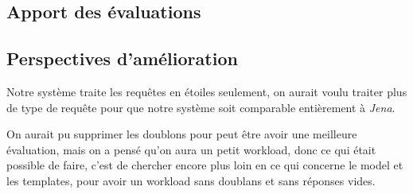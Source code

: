 \documentclass[12pt,titlepage]{article}
\begin{document}
\subsection{Apport des évaluations}

\subsection{Perspectives d'amélioration}
Notre système traite les requêtes en étoiles seulement, on aurait voulu traiter plus de type de requête pour que notre système soit comparable entièrement à \textit{Jena}. 

On aurait pu supprimer les doublons pour peut être avoir une meilleure évaluation, mais on a pensé qu'on aura un petit workload, donc ce qui était possible de faire, c'est de chercher encore plus loin en ce qui concerne le model et les templates, pour avoir un workload sans doublans et sans réponses vides. 
\end{document}
